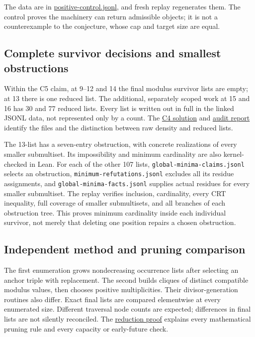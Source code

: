 \documentclass[11pt,a4paper]{article}
\begin{document}
The data are in \href{https://github.com/mpelteshki/climbing-to-the-frontier/blob/ed55f76eb8c558825bb629fd2cd8dbf46e5f1314/cagent/p4/audit/positive-control.jsonl}{positive-control.jsonl}, and fresh replay regenerates them. The control proves the machinery can return admissible objects; it is not a counterexample to the conjecture, whose cap and target size are equal.

\subsection{Complete survivor decisions and smallest obstructions}\label{complete-survivor-decisions-and-smallest-obstructions}

Within the C5 claim, at 9--12 and 14 the final modulus survivor lists are empty; at 13 there is one reduced list. The additional, separately scoped work at 15 and 16 has 30 and 77 reduced lists. Every list is written out in full in the linked JSONL data, not represented only by a count. The \href{https://github.com/mpelteshki/climbing-to-the-frontier/blob/ed55f76eb8c558825bb629fd2cd8dbf46e5f1314/cagent/p4/c4/solution.md}{C4 solution} and \href{https://github.com/mpelteshki/climbing-to-the-frontier/blob/ed55f76eb8c558825bb629fd2cd8dbf46e5f1314/cagent/p4/audit/REPORT.md}{audit report} identify the files and the distinction between raw density and reduced lists.

The 13-list has a seven-entry obstruction, with concrete realizations of every smaller submultiset. Its impossibility and minimum cardinality are also kernel-checked in Lean. For each of the other 107 lists, \texttt{global-minima-claims.jsonl} selects an obstruction, \texttt{minimum-refutations.jsonl} excludes all its residue assignments, and \texttt{global-minima-facts.jsonl} supplies actual residues for every smaller submultiset. The replay verifies inclusion, cardinality, every CRT inequality, full coverage of smaller submultisets, and all branches of each obstruction tree. This proves minimum cardinality inside each individual survivor, not merely that deleting one position repairs a chosen obstruction.

\subsection{Independent method and pruning comparison}\label{independent-method-and-pruning-comparison}

The first enumeration grows nondecreasing occurrence lists after selecting an anchor triple with replacement. The second builds cliques of distinct compatible modulus values, then chooses positive multiplicities. Their divisor-generation routines also differ. Exact final lists are compared elementwise at every enumerated size. Different traversal node counts are expected; differences in final lists are not silently reconciled. The \href{https://github.com/mpelteshki/climbing-to-the-frontier/blob/ed55f76eb8c558825bb629fd2cd8dbf46e5f1314/cagent/p4/audit/reduction-proof.md}{reduction proof} explains every mathematical pruning rule and every capacity or early-future check.
\end{document}
